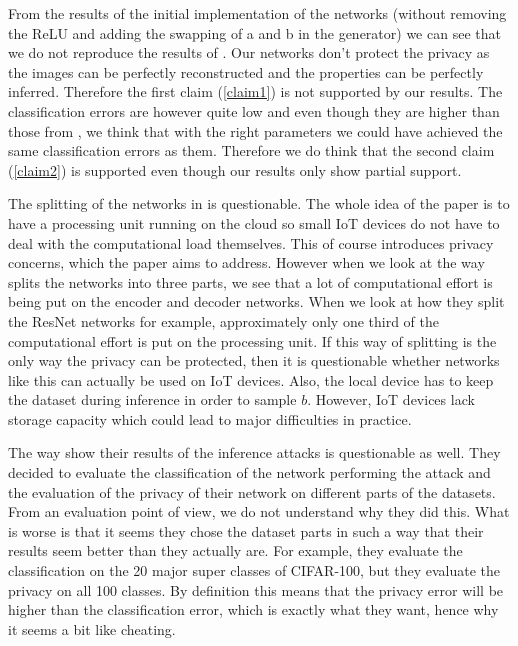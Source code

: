 From the results of the initial implementation of the networks (without removing the ReLU and adding the swapping of a and b in the generator) we can see that we do not reproduce the results of \citet{xiang2020interpretable}. Our networks don't protect the privacy as the images can be perfectly reconstructed and the properties can be perfectly inferred. Therefore the first claim (\ref{claim1}) is not supported by our results. The classification errors are however quite low and even though they are higher than those from \citet{xiang2020interpretable}, we think that with the right parameters we could have achieved the same classification errors as them. Therefore we do think that the second claim (\ref{claim2}) is supported even though our results only show partial support.

The splitting of the networks in \citet{xiang2020interpretable} is questionable. The whole idea of the paper is to have a processing unit running on the cloud so small IoT devices do not have to deal with the computational load themselves. This of course introduces privacy concerns, which the paper aims to address. However when we look at the way \citet{xiang2020interpretable} splits the networks into three parts, we see that a lot of computational effort is being put on the encoder and decoder networks. When we look at how they split the ResNet networks for example, approximately only one third of the computational effort is put on the processing unit. If this way of splitting is the only way the privacy can be protected, then it is questionable whether networks like this can actually be used on IoT devices. Also, the local device has to keep the dataset during inference in order to sample $b$. However, IoT devices lack storage capacity which could lead to major difficulties in practice.

The way \citet{xiang2020interpretable} show their results of the inference attacks is questionable as well. They decided to evaluate the classification of the network performing the attack and the evaluation of the privacy of their network on different parts of the datasets. From an evaluation point of view, we do not understand why they did this. What is worse is that it seems they chose the dataset parts in such a way that their results seem better than they actually are. For example, they evaluate the classification on the 20 major super classes of CIFAR-100, but they evaluate the privacy on all 100 classes. By definition this means that the privacy error will be higher than the classification error, which is exactly what they want, hence why it seems a bit like cheating.

